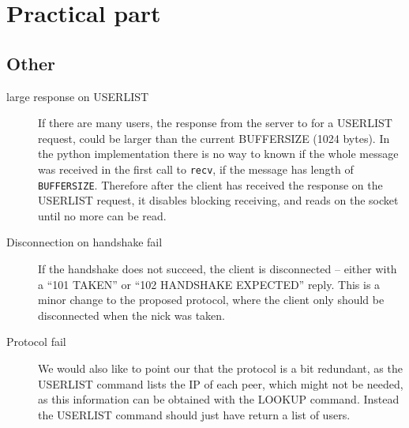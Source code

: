 \section{Practical part}

\subsection{Other}
\begin{description}
    \item[large response on USERLIST]
        If there are many users, the response from the server to for a USERLIST request, could be larger than the current BUFFERSIZE (1024 bytes). In the python implementation there is no way to known if the whole message was received in the first call to \texttt{recv}, if the message has length of \texttt{BUFFERSIZE}. Therefore after the client has received the response on the USERLIST request, it disables blocking receiving, and reads on the socket until no more can be read.
    \item[Disconnection on handshake fail]
        If the handshake does not succeed, the client is disconnected -- either with a ``101 TAKEN'' or ``102 HANDSHAKE EXPECTED'' reply. This is a minor change to the proposed protocol, where the client only should be disconnected when the nick was taken.
    \item[Protocol fail]
        We would also like to point our that the protocol is a bit redundant, as the USERLIST command lists the IP of each peer, which might not be needed, as this information can be obtained with the LOOKUP command. Instead the USERLIST command should just have return a list of users.
\end{description}

